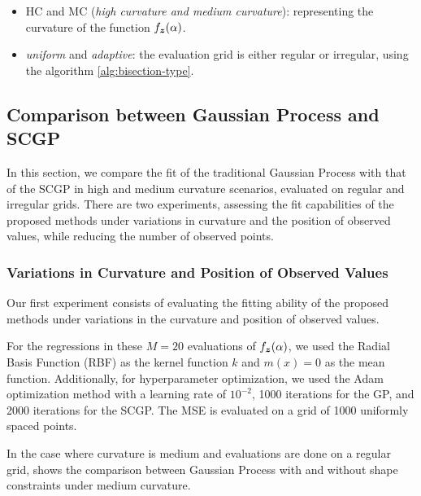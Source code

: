 \begin{itemize}
    \item HC and MC (\textit{high curvature and medium curvature}): representing the curvature of the function \( f_{\boldsymbol{z}}(\alpha) \).
    \item \textit{uniform} and \textit{adaptive}: the evaluation grid is either regular or irregular, using the algorithm \ref{alg:bisection-type}.
\end{itemize}

\subsection{Comparison between Gaussian Process and SCGP}

In this section, we compare the fit of the traditional Gaussian Process with that of the SCGP in high and medium curvature scenarios, evaluated on regular and irregular grids.
There are two experiments, assessing the fit capabilities of the proposed methods under variations in curvature and the position of observed values, while reducing the number of observed points.

\subsubsection{Variations in Curvature and Position of Observed Values}
\label{sec:curvature}

Our first experiment consists of evaluating the fitting ability of the proposed methods under variations in the curvature and position of observed values.

For the regressions in these \( M=20 \) evaluations of \( f_{\boldsymbol{z}}(\alpha) \), we used the Radial Basis Function (RBF) as the kernel function \( k \) and \( m(x) = 0 \) as the mean function.
Additionally, for hyperparameter optimization, we used the Adam optimization method \citep{Kingma2017} with a learning rate of \( 10^{-2} \), 1000 iterations for the GP, and 2000 iterations for the SCGP.
The MSE is evaluated on a grid of 1000 uniformly spaced points.

In the case where curvature is medium and evaluations are done on a regular grid,  shows the comparison between Gaussian Process with and without shape constraints under medium curvature.

